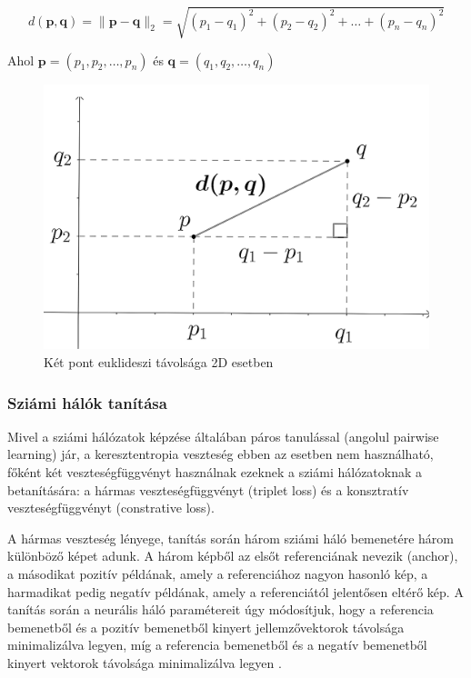 
\[ d(\mathbf{p},\mathbf{q}) = \lVert \mathbf{p} - \mathbf{q} \rVert_2 = \sqrt{(p_1 - q_1)^2 + (p_2 - q_2)^2 + \dots + (p_n - q_n)^2}\]

Ahol $\mathbf{p} = (p_1, p_2, \dots, p_n)$ és $\mathbf{q} = (q_1, q_2, \dots, q_n)$ 

\begin{figure}[h]
	\centering
	\includegraphics[width=0.65\columnwidth]{figures/euklidesz.png}
	\caption{Két pont euklideszi távolsága 2D esetben}
	\label{fig:eukl}
\end{figure}

\subsubsection{Sziámi hálók tanítása}

Mivel a sziámi hálózatok képzése általában páros tanulással (angolul pairwise learning) jár, a keresztentropia veszteség ebben az esetben nem használható, főként két veszteségfüggvényt használnak ezeknek a sziámi hálózatoknak a betanítására: a hármas veszteségfüggvényt (triplet loss) és a konsztratív veszteségfüggvényt (constrative loss).

A hármas veszteség lényege, tanítás során három sziámi háló bemenetére három különböző képet adunk. A három képből az elsőt referenciának nevezik (anchor), a másodikat pozitív példának, amely a referenciához nagyon hasonló kép, a harmadikat pedig negatív példának, amely a referenciától jelentősen eltérő kép. A tanítás során a neurális háló paramétereit úgy módosítjuk, hogy a referencia bemenetből és a pozitív bemenetből kinyert jellemzővektorok távolsága minimalizálva legyen, míg a referencia bemenetből és a negatív bemenetből kinyert vektorok távolsága minimalizálva legyen \cite{hoffer2015triplet}.

